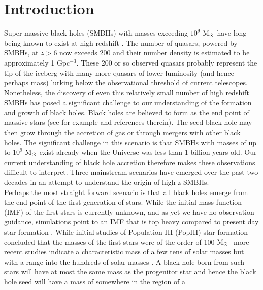 \documentclass[graphics, twocolumn, usenatbib]{mn2e}
\newcommand{\msolar} {$\rm{M_{\odot}}~$}
\begin{document}
\section{Introduction} \label{Sec:Introduction}
Super-massive black holes (SMBHs) with masses exceeding $10^{9}$ \msolar have long being known to
exist at high redshift \citep[e.g.][]{Fan_2001, Dietrich_2002, Fan_2003, Vestergaard_2004,
  Fan_2004, Fan_06}.
The number of quasars, powered by SMBHs, at $z > 6$ now exceeds 200 \citep[e.g][]{Matsuoka_2019} and their number
density is estimated to be approximately 1 Gpc$^{-3}$. These 200 or so observed quasars probably
represent the tip of the iceberg with many more quasars of lower luminosity (and hence perhaps mass)
lurking below the observational threshold of current telescopes. \\
\indent Nonetheless, the discovery of even this relatively small number of high redshift SMBHs
has posed a significant challenge to our understanding of the formation and growth of black holes.
Black holes are believed to form as the end point of massive stars (see for example
\cite{Volonteri_2010a} and references therein). The seed black hole may then grow through the
accretion of gas or through mergers with other black holes. The significant challenge in this
scenario is that SMBHs with masses of up to $10^{9}$ \msolar exist \citep[e.g][]{Banados_2018} already when
the Universe was less than 1 billion years old. Our current understanding of black hole accretion
therefore makes these observations difficult to interpret. Three mainstream scenarios have
emerged over the past two decades in an attempt to understand the origin of high-z SMBHs. \\
\indent Perhaps the most straight forward scenario is that all black holes emerge from the end
point of the first generation of stars. While the initial mass function (IMF) of the first stars
is currently unknown, and as yet we have no observation guidance, simulations point to an IMF that
is top heavy compared to present day star formation \citep{Yoshida_2006, Turk_2009,
  Clark_2011a, Hirano_2014}. While initial studies of Population III (PopIII) star formation
concluded that the masses of the first stars were of the order of 100 \msolar \citep{Bromm_1999,
  Abel_2002, Bromm_2002} more recent studies indicate a characteristic mass of a few tens of solar
masses but with a range into the hundreds of solar masses \citep{Stacy_2010, Stacy_2012, Stacy_2014,
  Hirano_2014}. A black hole born from such stars will have at most the same mass as the
progenitor star and hence the black hole seed will have a mass of somewhere in the region of a
\end{document}
